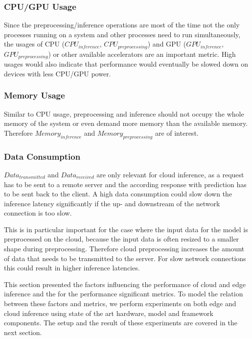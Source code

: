 \subsubsection{CPU/GPU Usage}
Since the preprocessing/inference operations are most of the time not the only processes running on a system and other processes need to run simultaneously, the usages of CPU ($CPU_{inference}$, $CPU_{preprocessing}$) and GPU ($GPU_{inference}$, $GPU_{preprocessing}$) or other available accelerators are an important metric.
High usages would also indicate that performance would eventually be slowed down on devices with less CPU/GPU power.


\subsubsection{Memory Usage}
Similar to CPU usage, preprocessing and inference should not occupy the whole memory of the system or even demand more memory than the available memory. Therefore $Memory_{inference}$ and $Memory_{preprocessing}$ are of interest.

\subsubsection{Data Consumption}
$Data_{transmitted}$ and $Data_{received}$ are only relevant for cloud inference, as a request has to be sent to a remote server and the according response with prediction has to be sent back to the client. A high data consumption could slow down the inference latency significantly if the up- and downstream of the network connection is too slow. 

This is in particular important for the case where the input data for the model is preprocessed on the cloud, because the input data is often resized to a smaller shape during preprocessing. Therefore cloud preprocessing increases the amount of data that needs to be transmitted to the server. For slow network connections this could result in higher inference latencies.




This section presented the factors influencing the performance of cloud and edge inference and the for the performance significant metrics.
To model the relation between these factors and metrics, we perform experiments on both edge and cloud inference using state of the art hardware, model and framework components. The setup and the result of these experiments are covered in the next section.
\endinput 